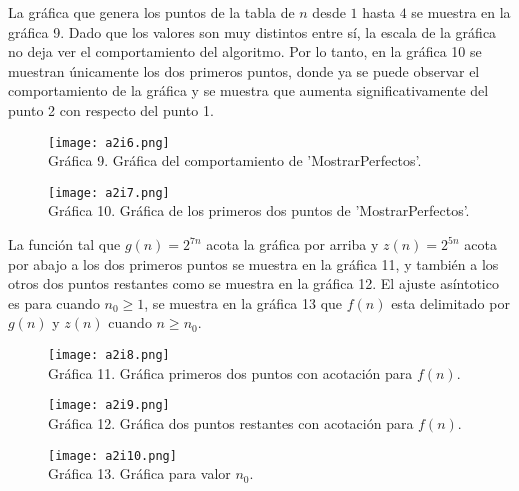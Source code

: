 \documentclass[12pt,twoside]{article}
\begin{document}
La gráfica que genera los puntos de la tabla de $n$ desde $1$ hasta $4$ se muestra en la gráfica 9. Dado que los valores son muy distintos entre sí, la escala de la gráfica no deja ver el comportamiento del algoritmo. Por lo tanto, en la gráfica 10 se muestran únicamente los dos primeros puntos, donde ya se puede observar el comportamiento de la gráfica y se muestra que aumenta significativamente del punto 2 con respecto del punto 1.

\medskip
\begin{figure}[h]
  \begin{center}
    \texttt{[image: a2i6.png]}
    \\
    Gráfica 9. Gráfica del comportamiento de 'MostrarPerfectos'.
  \end{center}
\end{figure}
\newpage
\begin{figure}[h]
  \begin{center}
    \texttt{[image: a2i7.png]}
    \\
    Gráfica 10. Gráfica de los primeros dos puntos de 'MostrarPerfectos'.
  \end{center}
\end{figure}
\medskip

La función tal que $g(n)=2^{7n}$ acota la gráfica por arriba y $z(n)=2^{5n}$ acota por abajo a los dos primeros puntos se muestra en la gráfica 11, y también a los otros dos puntos restantes como se muestra en la gráfica 12. El ajuste asíntotico es para cuando $n_0\geq 1$, se muestra en la gráfica 13 que $f(n)$ esta delimitado por $g(n)$ y $z(n)$ cuando $n\geq n_0$.
\medskip
\begin{figure}[h]
  \begin{center}
    \texttt{[image: a2i8.png]}
    \\Gráfica 11. Gráfica primeros dos puntos con acotación para $f(n)$.
  \end{center}
\end{figure}
\begin{figure}[h]
  \begin{center}
    \texttt{[image: a2i9.png]}
    \\
    Gráfica 12. Gráfica dos puntos restantes con acotación para $f(n)$.
  \end{center}
\end{figure}
\newpage
\begin{figure}[h]
  \begin{center}
    \texttt{[image: a2i10.png]}
    \\
    Gráfica 13. Gráfica para valor $n_0$.
  \end{center}
\end{figure}
\newpage
\end{document}
